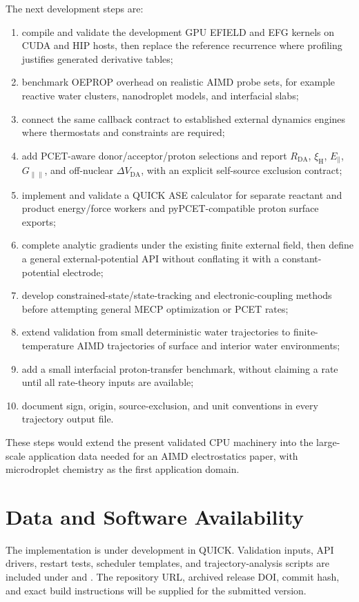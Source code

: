 \documentclass[journal=jctcce,manuscript=article,email=false]{achemso}
\newcommand{\quick}{QUICK}
\begin{document}
The next development steps are:
\begin{enumerate}
  \item compile and validate the development GPU EFIELD and EFG kernels on
    CUDA and HIP hosts, then replace the reference recurrence where
    profiling justifies generated derivative tables;
  \item benchmark OEPROP overhead on realistic AIMD probe sets, for
    example reactive water clusters, nanodroplet models, and interfacial
    slabs;
  \item connect the same callback contract to established external
    dynamics engines where thermostats and constraints are required;
  \item add PCET-aware donor/acceptor/proton selections and report
    \(R_{\mathrm{DA}}\), \(\xi_{\mathrm H}\),
    \(E_{\parallel}\), \(G_{\parallel\parallel}\), and off-nuclear
    \(\Delta V_{\mathrm{DA}}\), with an explicit self-source exclusion
    contract;
  \item implement and validate a QUICK ASE calculator for separate
    reactant and product energy/force workers and pyPCET-compatible proton
    surface exports;
  \item complete analytic gradients under the existing finite external
    field, then define a general external-potential API without conflating
    it with a constant-potential electrode;
  \item develop constrained-state/state-tracking and electronic-coupling
    methods before attempting general MECP optimization or PCET rates;
  \item extend validation from small deterministic water trajectories to
    finite-temperature AIMD trajectories of surface and interior water
    environments;
  \item add a small interfacial proton-transfer benchmark, without
    claiming a rate until all rate-theory inputs are available;
  \item document sign, origin, source-exclusion, and unit conventions in every trajectory
    output file.
\end{enumerate}
These steps would extend the present validated CPU machinery into the
large-scale application data needed for an AIMD electrostatics paper, with
microdroplet chemistry as the first application domain.

\section{Data and Software Availability}

The implementation is under development in \quick{}.  Validation inputs,
API drivers, restart tests, scheduler templates, and trajectory-analysis
scripts are included under  and
.  The repository URL, archived release DOI,
commit hash, and exact build instructions will be supplied for the
submitted version.



\end{document}
